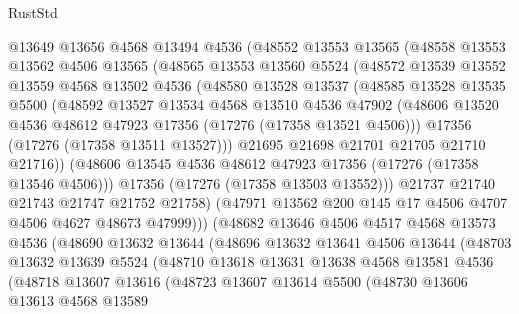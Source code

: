 \begin{lexlean}{RustStd}
\begin{coremodule}
          @13649
          @13656
          @4568
          @13494
          @4536
          (@48552
            @13553
            @13565
            (@48558
              @13553
              @13562
              @4506
              @13565
              (@48565
                @13553
                @13560
                @5524
                (@48572
                  @13539
                  @13552
                  @13559
                  @4568
                  @13502
                  @4536
                  (@48580
                    @13528
                    @13537
                    (@48585
                      @13528
                      @13535
                      @5500
                      (@48592
                        @13527
                        @13534
                        @4568
                        @13510
                        @4536
                        @47902
                        (@48606 @13520 @4536 @48612 @47923 @17356 (@17276 (@17358 @13521 @4506)))
                        @17356
                        (@17276 (@17358 @13511 @13527)))
                      @21695
                      @21698
                      @21701
                      @21705
                      @21710
                      @21716))
                  (@48606 @13545 @4536 @48612 @47923 @17356 (@17276 (@17358 @13546 @4506)))
                  @17356
                  (@17276 (@17358 @13503 @13552)))
                @21737
                @21740
                @21743
                @21747
                @21752
                @21758)
              (@47971 @13562 @200 @145 @17 @4506 @4707 @4506 @4627 @48673 @47999)))
          (@48682
            @13646
            @4506
            @4517
            @4568
            @13573
            @4536
            (@48690
              @13632
              @13644
              (@48696
                @13632
                @13641
                @4506
                @13644
                (@48703
                  @13632
                  @13639
                  @5524
                  (@48710
                    @13618
                    @13631
                    @13638
                    @4568
                    @13581
                    @4536
                    (@48718
                      @13607
                      @13616
                      (@48723
                        @13607
                        @13614
                        @5500
                        (@48730
                          @13606
                          @13613
                          @4568
                          @13589

\end{coremodule}
\end{lexlean}

